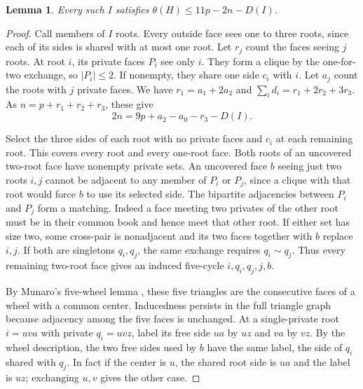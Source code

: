 \documentclass[11pt,a4paper]{article}
\newtheorem{lemma}[theorem]{Lemma}
\begin{document}
\begin{lemma}\label{lem:local}
Every such \(I\) satisfies \(\theta(H)\le 11p-2n-D(I)\).
\end{lemma}
\begin{proof}
Call members of \(I\) roots. Every outside face sees one to three roots,
since each of its sides is shared with at most one root. Let \(r_j\)
count the faces seeing \(j\) roots. At root \(i\), its private faces
\(P_i\) see only \(i\). They form a clique by the one-for-two exchange,
so \(|P_i|\le2\). If nonempty, they share one side \(c_i\) with \(i\).
Let \(a_j\) count the roots with \(j\) private faces. We have
\(r_1=a_1+2a_2\) and \(\sum_i d_i=r_1+2r_2+3r_3\).
As \(n=p+r_1+r_2+r_3\), these give
\begin{equation}\label{eq:count}
2n=9p+a_2-a_0-r_3-D(I).
\end{equation}

Select the three sides of each root with no private faces and \(c_i\)
at each remaining root. This covers every root and every one-root face.
Both roots of an uncovered two-root face have nonempty private sets.
An uncovered face \(b\) seeing just two roots
\(i,j\) cannot be adjacent to any member of \(P_i\) or \(P_j\), since a
clique with that root would force \(b\) to use its selected side.
The bipartite adjacencies between \(P_i\) and \(P_j\) form a matching.
Indeed a face meeting two privates of the other root must be in their
common book and hence meet that other root. If either set has size two,
some cross-pair is nonadjacent and its two faces together with \(b\)
replace \(i,j\). If both are singletons \(q_i,q_j\), the same exchange
requires \(q_i\sim q_j\). Thus every remaining two-root face gives an
induced five-cycle \(i,q_i,q_j,j,b\).

By Munaro's five-wheel lemma \cite[Lemma 9]{munaro}, these five triangles
are the consecutive faces of a wheel with a common center. Inducedness
persists in the full triangle graph because adjacency among the five faces
is unchanged. At a single-private root \(i=uva\) with private \(q_i=uvz\),
label its free side \(ua\) by \(uz\) and \(va\) by \(vz\). By the wheel
description, the two free sides used by \(b\) have the same label, the
side of \(q_i\) shared with \(q_j\). In fact if the center is \(u\), the
shared root side is \(ua\) and the label is \(uz\); exchanging \(u,v\)
gives the other case.


\end{proof}
\end{document}
